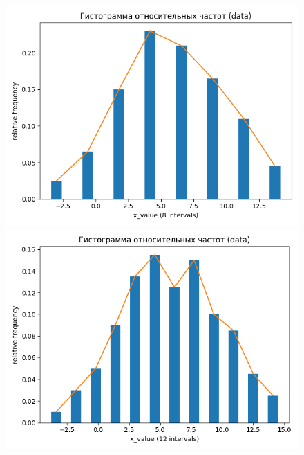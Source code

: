 \begin{figure}[H]
	\begin{minipage}[H]{0.49\linewidth}
		\begin{center}
			\includegraphics[width=\linewidth]{figures/rel_freq_hist_8_bins_data}
		\end{center}
	\end{minipage}
	\hfill
	\begin{minipage}[H]{0.49\linewidth}
		\begin{center}
			\includegraphics[width=\linewidth]{figures/rel_freq_hist_12_bins_data}
		\end{center}
	\end{minipage}
\end{figure}

